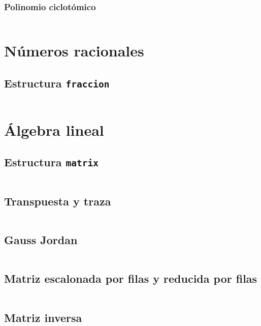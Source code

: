 \documentclass[11pt]{article}
\begin{document}
			\subsubsection{Polinomio ciclotómico}
			\inputminted[tabsize=2,breaklines,firstline=1078,lastline=1096,fontsize=\small]{c++}{numberTheory.cpp}
			
	\newpage
	\section{Números racionales}
		\subsection{Estructura \texttt{fraccion}}
		\inputminted[tabsize=2,breaklines,firstline=7,lastline=123,fontsize=\small]{c++}{fraccion.cpp}
		
	\newpage
	\section{Álgebra lineal}
		\subsection{Estructura \texttt{matrix}}
		\inputminted[tabsize=2,breaklines,firstline=7,lastline=130,fontsize=\small]{c++}{matrix.cpp}
		
		\subsection{Transpuesta y traza}
		\inputminted[tabsize=2,breaklines,firstline=132,lastline=145,fontsize=\small]{c++}{matrix.cpp}
		
		\subsection{Gauss Jordan}
		\inputminted[tabsize=2,breaklines,firstline=147,lastline=190,fontsize=\small]{c++}{matrix.cpp}
		
		\subsection{Matriz escalonada por filas y reducida por filas}
		\inputminted[tabsize=2,breaklines,firstline=192,lastline=202,fontsize=\small]{c++}{matrix.cpp}
		
		\subsection{Matriz inversa}
		\inputminted[tabsize=2,breaklines,firstline=204,lastline=225,fontsize=\small]{c++}{matrix.cpp}
		
\end{document}
